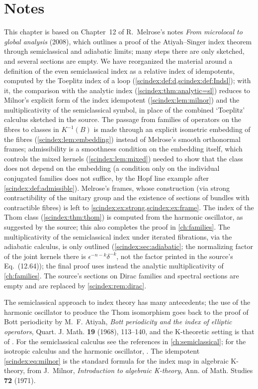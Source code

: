 \section*{Notes}
This chapter is based on Chapter~12 of R.~Melrose's notes \emph{From microlocal
to global analysis} (2008), which outlines a proof of the Atiyah--Singer index
theorem through semiclassical and adiabatic limits; many steps there are only
sketched, and several sections are empty. We have reorganized the material
around a definition of the even semiclassical index as a relative index of
idempotents, computed by the Toeplitz index of a loop
(\cref{scindex:def:d,scindex:def:Indsl}); with it, the comparison with the analytic
index (\cref{scindex:thm:analytic=sl}) reduces to Milnor's explicit form of the
index idempotent (\cref{scindex:lem:milnor}) and the multiplicativity of the
semiclassical symbol, in place of the combined `Toeplitz' calculus sketched in the
source. The passage from families of operators on the fibres to classes in
$K^{-1}(B)$ is made through an explicit isometric embedding of the fibres
(\cref{scindex:lem:embedding}) instead of Melrose's smooth orthonormal frames;
admissibility is a smoothness condition on the embedding itself, which controls the
mixed kernels (\cref{scindex:lem:mixed}) needed to show that the class does not
depend on the embedding (a condition only on the individual conjugated families
does not suffice, by the Hopf line example after \cref{scindex:def:admissible}).
Melrose's frames,
whose construction (via strong contractibility of the unitary group and the
existence of sections of bundles with contractible fibres) is left to
\cref{scindex:ex:strong,scindex:ex:frame}. The index of the Thom class
(\cref{scindex:thm:thom}) is computed from the harmonic oscillator, as suggested
by the source; this also completes the proof in \cref{ch:families}. The
multiplicativity of the semiclassical index under iterated fibrations, via the
adiabatic calculus, is only outlined (\cref{scindex:sec:adiabatic}; the
normalizing factor of the joint kernels there is $\epsilon^{-n-k}\delta^{-k}$,
not the factor printed in the source's Eq.~(12.64)); the final
proof uses instead the analytic multiplicativity of \cref{ch:families}. The
source's sections on Dirac families and spectral sections are empty and are
replaced by \cref{scindex:rem:dirac}.

The semiclassical approach to index theory has many antecedents; the use of the
harmonic oscillator to produce the Thom isomorphism goes back to the proof of Bott
periodicity by M.~F. Atiyah, \emph{Bott periodicity and the index of elliptic
operators}, Quart. J. Math. \textbf{19} (1968), 113--140, and the K-theoretic
setting is that of \cite{Atiyah-K,Atiyah-Singer-IV}. For the semiclassical
calculus see the references in \cref{ch:semiclassical}; for the isotropic calculus
and the harmonic oscillator, \cite{Shubin}. The idempotent \eqref{scindex:eq:milnor}
is the standard formula for the index map in algebraic K-theory, from J.~Milnor,
\emph{Introduction to algebraic K-theory}, Ann. of Math. Studies \textbf{72} (1971).

